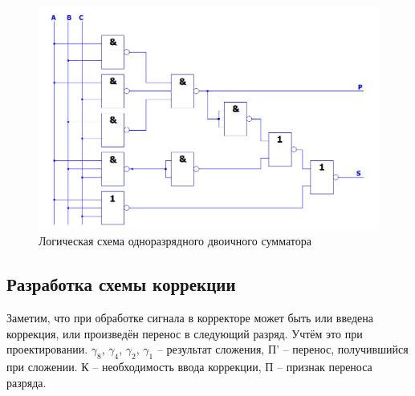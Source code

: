 \documentclass[a4paper,14pt]{article}
\begin{document}
\begin{figure}[H]
	\centering
	\includegraphics[width=\linewidth]{schemas/sm}
	\caption{Логическая схема одноразрядного двоичного сумматора}
	\label{fig:sm}
\end{figure}

\subsection{Разработка схемы коррекции}

Заметим, что при обработке сигнала в корректоре может быть или введена коррекция, или произведён перенос в следующий разряд.
Учтём это при проектировании.
$\gamma_8$, $\gamma_4$, $\gamma_2$, $\gamma_1$ -- результат сложения, П' -- перенос, получившийся при сложении.
К -- необходимость ввода коррекции, П -- признак переноса разряда.
\end{document}
